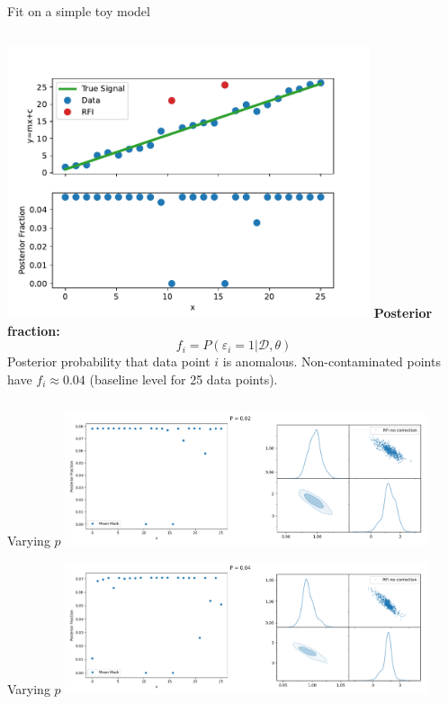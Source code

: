 \documentclass[aspectratio=169]{beamer}
\begin{document}
\begin{frame}{Fit on a simple toy model}
  \begin{columns}
    \centering
    \includegraphics[width=0.8\textwidth]{images/test.pdf}
    \footnotesize
    \textbf{Posterior fraction:}
    \begin{equation}
        f_i = P(\varepsilon_i = 1 | \mathcal{D}, \theta)
    \end{equation}
    Posterior probability that data point $i$ is anomalous. Non-contaminated points have $f_i \approx 0.04$ (baseline level for 25 data points).
  \end{columns}
\end{frame}

\begin{frame}{Varying $p$}
    \centering
    \includegraphics[width=0.8\textwidth]{images/gif_anest/comb_2.png}
\end{frame}

\begin{frame}{Varying $p$}
    \centering
    \includegraphics[width=0.8\textwidth]{images/gif_anest/comb_3.png}
\end{frame}
\end{document}
